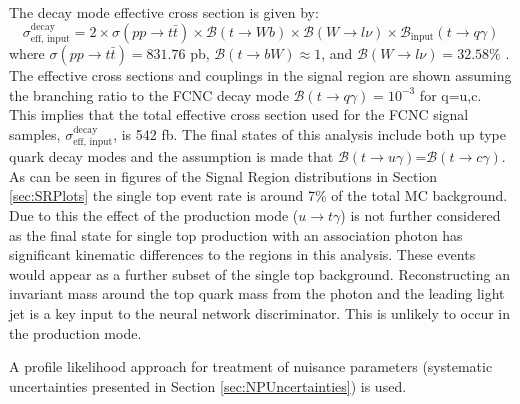 The decay mode effective cross section is given by:
\[\sigma_\text{eff, input}^\text{decay} = 2\times \sigma(pp\rightarrow t\bar{t}) \times \mathcal{B}(t\rightarrow Wb) \times \mathcal{B}(W\rightarrow l \nu)\times \mathcal{B}_\text{input}(t \rightarrow q \gamma)
\]
where $\sigma(pp\rightarrow t\bar{t}) =831.76$ pb, $\mathcal{B}(t\rightarrow bW) \approx1$, and $\mathcal{B}(W\rightarrow l \nu) =32.58\%$ .  The effective cross sections and couplings in the signal region are shown assuming the branching ratio to the FCNC decay mode $\mathcal{B}(t\rightarrow q \gamma) = 10^{-3}$ for q=u,c.  This implies that the total effective cross section used for the FCNC signal samples, $\sigma_\text{eff, input}^\text{decay}$, is 542 fb.  The final states of this analysis include both up type quark decay modes and the assumption is made that $\mathcal{B}(t\rightarrow u\gamma)$=$\mathcal{B}(t\rightarrow c\gamma)$.  As can be seen in figures of the Signal Region distributions in Section \ref{sec:SRPlots} the single top event rate is around 7\% of the total MC background.  Due to this the effect of the production mode ($u\rightarrow t\gamma$) is not further considered as the final state for single top production with an association photon has significant kinematic differences to the regions in this analysis.  These events would appear as a further subset of the single top background.  Reconstructing an invariant mass around the top quark mass from the photon and the leading light jet is a key input to the neural network discriminator.  This is unlikely to occur in the production mode.

A profile likelihood approach for treatment of nuisance parameters\cite{Cowan:2010js} (systematic uncertainties presented in Section \ref{sec:NPUncertainties}) is used.

